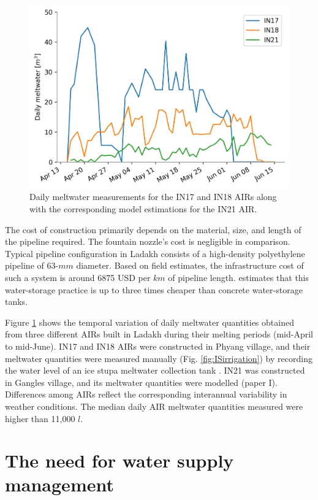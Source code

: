 \begin{figure}[htb]
	\centering
	\includegraphics[width=\textwidth]{figs/melt.png}
	\caption{Daily meltwater measurements for the IN17 and IN18 AIRs along with the corresponding model estimations
		for the IN21 AIR. }
	\label{fig:ISmelt}
\end{figure}

The cost of construction primarily depends on the material, size, and length of the pipeline required. The
fountain nozzle's cost is negligible in comparison. Typical pipeline configuration in Ladakh consists of a high-density polyethylene pipeline of 63-$mm$ diameter. Based on field estimates, the infrastructure cost of such a
system is around 6875 USD per $km$ of pipeline length. \citet{basitafzalArtificialGlaciers2016} estimates that
this water-storage practice is up to three times cheaper than concrete water-storage tanks.

Figure \ref{fig:ISmelt} shows the temporal variation of daily meltwater quantities obtained from three different
AIRs built in Ladakh during their melting periods (mid-April to mid-June). IN17 and IN18 AIRs were constructed
in Phyang village, and their meltwater quantities were measured manually (Fig. \ref{fig:ISirrigation}) by recording the water level of an ice stupa meltwater collection tank
\citep{vermaIceStupaMeltwater2018}. IN21 was constructed in Gangles village, and its meltwater quantities
were modelled (paper I). Differences among AIRs reflect the corresponding interannual variability in weather
conditions. The median daily AIR meltwater quantities measured were higher than 11,000 $l$.

\section{The need for water supply management}

